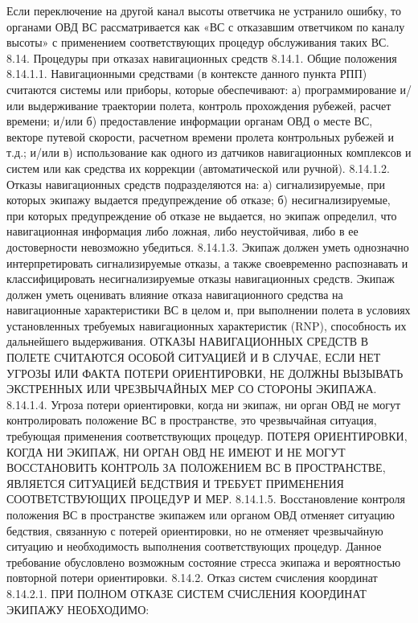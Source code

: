 Если переключение на другой канал высоты ответчика не устранило ошибку, то органами ОВД ВС рассматривается как «ВС с отказавшим ответчиком по каналу высоты» с применением соответствующих процедур обслуживания таких ВС.
8.14.	Процедуры при отказах навигационных средств 
8.14.1.	Общие положения
8.14.1.1. Навигационными средствами (в контексте данного пункта РПП) считаются системы или приборы, которые обеспечивают:
а)	программирование и/или выдерживание траектории полета, контроль прохождения рубежей, расчет времени; и/или
б)	предоставление информации органам ОВД о месте ВС, векторе путевой скорости, расчетном времени пролета контрольных рубежей и т.д.; и/или
в)	использование как одного из датчиков навигационных комплексов и систем или как средства их коррекции (автоматической или ручной). 
8.14.1.2. Отказы навигационных средств подразделяются на:
а)	сигнализируемые, при которых экипажу выдается предупреждение об отказе;
б)	несигнализируемые, при которых предупреждение об отказе не выдается, но экипаж определил, что навигационная информация либо ложная, либо неустойчивая, либо в ее достоверности невозможно убедиться.
8.14.1.3. Экипаж должен уметь однозначно интерпретировать сигнализируемые отказы, а также своевременно распознавать и классифицировать несигнализируемые отказы навигационных средств.
Экипаж должен уметь оценивать влияние отказа навигационного средства на навигационные характеристики ВС в целом и, при выполнении полета в условиях установленных требуемых навигационных характеристик (RNP), способность их дальнейшего выдерживания.
ОТКАЗЫ НАВИГАЦИОННЫХ СРЕДСТВ В ПОЛЕТЕ СЧИТАЮТСЯ ОСОБОЙ СИТУАЦИЕЙ И В СЛУЧАЕ, ЕСЛИ НЕТ УГРОЗЫ ИЛИ ФАКТА ПОТЕРИ ОРИЕНТИРОВКИ, НЕ ДОЛЖНЫ ВЫЗЫВАТЬ ЭКСТРЕННЫХ ИЛИ ЧРЕЗВЫЧАЙНЫХ МЕР СО СТОРОНЫ ЭКИПАЖА. 
8.14.1.4. Угроза потери ориентировки, когда ни экипаж, ни орган ОВД не могут контролировать положение ВС в пространстве, это чрезвычайная ситуация, требующая применения соответствующих процедур. 
ПОТЕРЯ ОРИЕНТИРОВКИ, КОГДА НИ ЭКИПАЖ, НИ ОРГАН ОВД НЕ ИМЕЮТ И НЕ МОГУТ ВОССТАНОВИТЬ КОНТРОЛЬ ЗА ПОЛОЖЕНИЕМ ВС В ПРОСТРАНСТВЕ, ЯВЛЯЕТСЯ СИТУАЦИЕЙ БЕДСТВИЯ И ТРЕБУЕТ ПРИМЕНЕНИЯ СООТВЕТСТВУЮЩИХ ПРОЦЕДУР И МЕР.
8.14.1.5. Восстановление контроля положения ВС в пространстве экипажем или органом ОВД отменяет ситуацию бедствия, связанную с потерей ориентировки, но не отменяет чрезвычайную ситуацию и необходимость выполнения соответствующих процедур. Данное требование обусловлено возможным состояние стресса экипажа и вероятностью повторной потери ориентировки.
8.14.2.	Отказ систем счисления координат
8.14.2.1. ПРИ ПОЛНОМ ОТКАЗЕ СИСТЕМ СЧИСЛЕНИЯ КООРДИНАТ ЭКИПАЖУ НЕОБХОДИМО:
